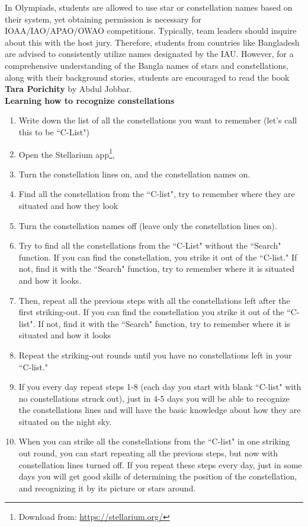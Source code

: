 \documentclass[a4paper,12pt]{extarticle}
\begin{document}
In Olympiads, students are allowed to use star or constellation names based on their system, yet obtaining permission is necessary for IOAA/IAO/APAO/OWAO competitions. Typically, team leaders should inquire about this with the host jury. Therefore, students from countries like Bangladesh are advised to consistently utilize names designated by the IAU. However, for a comprehensive understanding of the Bangla names of stars and constellations, along with their background stories, students are encouraged to read the book {\color{blue}\textbf{Tara Porichity} by Abdul Jobbar}.\\

\textbf{Learning how to recognize constellations}

\begin{enumerate}[1.]
	\itemsep0em 
	\item Write down the list of all the constellations you want to remember (let's call this to be ``C-List")
	\item Open the Stellarium app\footnote{Download from: \url{https://stellarium.org/}},
	\item Turn the constellation lines on, and the constellation names on.
	\item Find all the constellation from the ``C-list", try to remember where they are situated and how they look
	\item Turn the constellation names off (leave only the constellation lines on).
	\item Try to find all the constellations from the ``C-List" without the ``Search" function. If you can find the constellation, you strike it out of the ``C-list." If not, find it with the ``Search" function, try to remember where it is situated and how it looks.
	\item Then, repeat all the previous steps with all the constellations left after the first striking-out. If you can find the constellation you strike it out of the ``C-list". If not, find it with the ``Search" function, try to remember where it is situated and how it looks
	\item Repeat the striking-out rounds until you have no constellations left in your ``C-list."
	\item If you every day repeat steps 1-8 (each day you start with blank ``C-list" with no constellations struck out), just in 4-5 days you will be able to recognize the constellations lines and will have the basic knowledge about how they are situated on the night sky.
	\item When you can strike all the constellations from the ``C-list" in one striking out round, you can start repeating all the previous steps, but now with constellation lines turned off. If you repeat these steps every day, just in some days you will get good skills of determining the position of the constellation, and recognizing it by its picture or stars around.
	
\end{enumerate}
\end{document}
